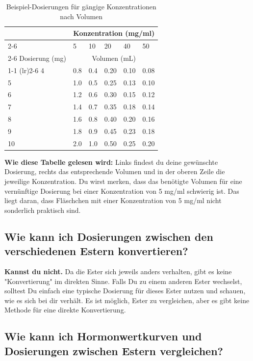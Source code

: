 \documentclass{article}
\begin{document}
{\begin{table}
	\centering
	\caption{Beispiel-Dosierungen für gängige Konzentrationen nach Volumen}
	\label{tab:concentrations}
	\begin{tabular}{@{}llllll@{}}
		\toprule
		\multicolumn{1}{c}{} & \multicolumn{5}{c}{Konzentration (mg/ml)} \\
		\cmidrule(rl){2-6}
		& 5    & 10  & 20 & 40 & 50   \\
		\cmidrule(rl){2-6}
		Dosierung (mg) & \multicolumn{5}{c}{Volumen (mL)}  \\
		\cmidrule(r){1-1} \cmidrule(lr){2-6}
		4        & 0.8  & 0.4 & 0.20  & 0.10 & 0.08\\
		5        & 1.0    & 0.5 & 0.25 & 0.13 &  0.10\\
		6        & 1.2  & 0.6   & 0.30  & 0.15 & 0.12   \\
		7        & 1.4  & 0.7 & 0.35  & 0.18 & 0.14\\
		8        & 1.6  & 0.8   & 0.40  & 0.20 & 0.16  \\
		9        & 1.8  & 0.9 & 0.45  & 0.23 & 0.18\\
		10       & 2.0    & 1.0   & 0.50  & 0.25 & 0.20 \\
		\bottomrule
	\end{tabular}
\end{table}

\textbf{Wie diese Tabelle gelesen wird:} Links findest du deine gewünschte Dosierung, rechts das entsprechende Volumen und in der oberen Zeile die jeweilige Konzentration. Du wirst merken, dass das benötigte Volumen für eine vernünftige Dosierung bei einer Konzentration von 5 mg/ml schwierig ist. Das liegt daran, dass Fläschchen mit einer Konzentration von 5 mg/ml nicht sonderlich praktisch sind.

\subsection{Wie kann ich Dosierungen zwischen den verschiedenen Estern konvertieren?}

\textbf{Kannst du nicht.} Da die Ester sich jeweils anders verhalten, gibt es keine "Konvertierung" im direkten Sinne. Falls Du zu einem anderen Ester wechselst, solltest Du einfach eine typische Dosierung für dieses Ester nutzen und schauen, wie es sich bei dir verhält. Es ist möglich, Ester zu vergleichen, aber es gibt keine Methode für eine direkte Konvertierung.

\subsection{Wie kann ich Hormonwertkurven und Dosierungen zwischen Estern vergleichen?}

}
\end{document}
